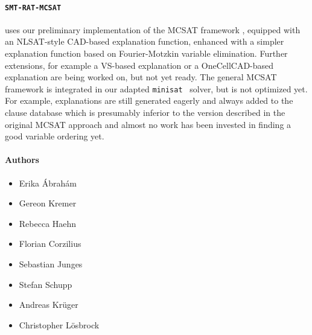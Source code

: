 \documentclass{article}
\begin{document}

\paragraph{\texttt{SMT-RAT-MCSAT}} uses our preliminary implementation of the MCSAT framework \cite{nlsat}, equipped with an NLSAT-style CAD-based explanation function, enhanced with a simpler explanation function based on Fourier-Motzkin variable elimination. Further extensions, for example a VS-based explanation or a OneCellCAD-based explanation are being worked on, but not yet ready.
The general MCSAT framework is integrated in our adapted \texttt{minisat}~\cite{minisat} solver, but is not optimized yet.
For example, explanations are still generated eagerly and always added to the clause database which is presumably inferior to the version described in the original MCSAT approach and almost no work has been invested in finding a good variable ordering yet.

\newpage

\paragraph{Authors}
\begin{itemize}
\item Erika \'Abrah\'am
\item Gereon Kremer
\item Rebecca Haehn
\item Florian Corzilius
\item Sebastian Junges
\item Stefan Schupp
\item Andreas Krüger
\item Christopher Lösbrock
\end{itemize}


  
\end{document}

